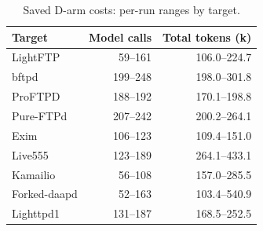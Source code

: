 \begin{table}[!tbp]
\centering\small
\caption{Saved D-arm costs: per-run ranges by target.}
\label{tab:observed_costs}
\begin{tabular}{lrr}
\toprule
Target & Model calls & Total tokens (k) \\
\midrule
LightFTP & 59--161 & 106.0--224.7 \\
bftpd & 199--248 & 198.0--301.8 \\
ProFTPD & 188--192 & 170.1--198.8 \\
Pure-FTPd & 207--242 & 200.2--264.1 \\
Exim & 106--123 & 109.4--151.0 \\
Live555 & 123--189 & 264.1--433.1 \\
Kamailio & 56--108 & 157.0--285.5 \\
Forked-daapd & 52--163 & 103.4--540.9 \\
Lighttpd1 & 131--187 & 168.5--252.5 \\
\bottomrule
\end{tabular}
\end{table}

